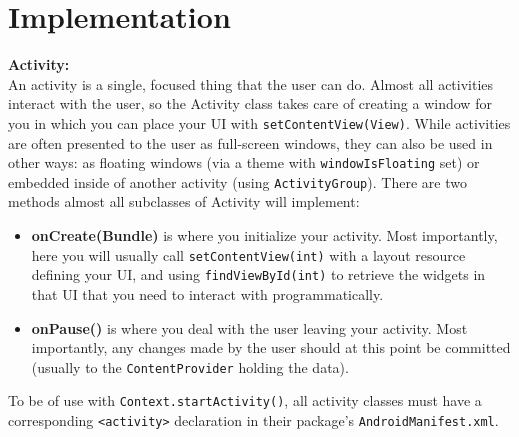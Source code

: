 \chapter{Implementation}
%
\textbf{Activity:}\\
\hspace*{0.82cm}An activity is a single, focused thing that the user can do. Almost all activities interact with the user, so the Activity 
class takes care of creating a window for you in which you can place your UI with \texttt{setContentView(View)}. While activities are often 
presented to the user as full-screen windows, they can also be used in other ways: as floating windows (via a theme with \texttt{windowIsFloating} 
set) or embedded inside of another activity (using \texttt{ActivityGroup}). There are two methods almost all subclasses of Activity will implement:
\begin{itemize}
 \item \textbf{onCreate(Bundle)} is where you initialize your activity. Most importantly, here you will usually call \texttt{setContentView(int)} 
with a layout resource defining your UI, and using \texttt{findViewById(int)} to retrieve the widgets in that UI that you need to interact with 
programmatically.
\item \textbf{onPause()} is where you deal with the user leaving your activity. Most importantly, any changes made by the user should at this 
point be committed (usually to the \texttt{ContentProvider} holding the data).
\end{itemize}
To be of use with \texttt{Context.startActivity()}, all activity classes must have a corresponding \texttt{<activity>} declaration in their 
package's \texttt{AndroidManifest.xml}.\\[0.5cm]

